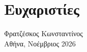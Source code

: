 \chapter*{Ευχαριστίες}


\vspace{2em}
\begin{flushright}
Φρατζέσκος Κωνσταντίνος\\
Αθήνα, Νοέμβριος 2026
\end{flushright}

\cleardoublepage
